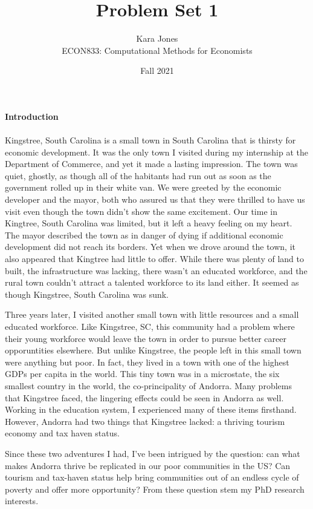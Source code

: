 \documentclass{article}
\begin{document}
\title{Problem Set 1}
\author{Kara Jones \\
ECON833: Computational Methods for Economists}
\date{Fall 2021}
\maketitle


    \paragraph{Introduction} 
       \paragraph {}Kingstree, South Carolina is a small town in South Carolina that is thirsty for economic development. 
    It was the only town I visited during my internship at the Department of Commerce, and yet it made a lasting impression.
    The town was quiet, ghostly, as though all of the habitants had run out as soon as the government rolled up in their white van. 
    We were greeted by the economic developer and the mayor, both who assured us that they were thrilled to have us visit even though the town didn't show the same excitement.
    Our time in Kingtree, South Carolina was limited, but it left a heavy feeling on my heart.
    The mayor described the town as in danger of dying if additional economic development did not reach its borders.
    Yet when we drove around the town, it also appeared that Kingtree had little to offer.
    While there was plenty of land to built, the infrastructure was lacking, there wasn't an educated workforce, and the rural town couldn't attract a talented workforce to its land either.
    It seemed as though Kingstree, South Carolina was sunk. \par
        Three years later, I visited another small town with little resources and a small educated workforce. 
    Like Kingstree, SC, this community had a problem where their young workforce would leave the town in order to pursue better career opporuntities elsewhere. 
    But unlike Kingstree, the people left in this small town were anything but poor. 
    In fact, they lived in a town with one of the highest GDPs per capita in the world. 
    This tiny town was in a microstate, the six smallest country in the world, the co-principality of Andorra. 
    Many problems that Kingstree faced, the lingering effects could be seen in Andorra as well. 
    Working in the education system, I experienced many of these items firsthand.
    However, Andorra had two things that Kingstree lacked: a thriving tourism economy and tax haven status. \par
        Since these two adventures I had, I've been intrigued by the question: can what makes Andorra thrive be replicated in our poor communities in the US?
    Can tourism and tax-haven status help bring communities out of an endless cycle of poverty and offer more opportunity?
    From these question stem my PhD research interests. 
\end{document}
